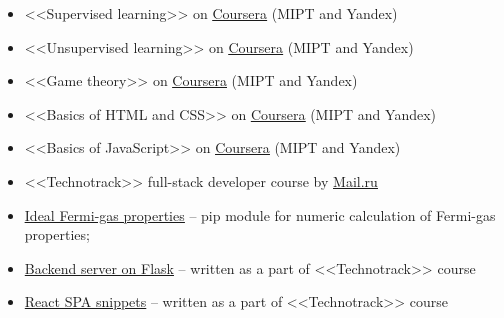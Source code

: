 
\begin{itemize}
	\item <<Supervised learning>> on \href{https://www.coursera.org/learn/supervised-learning?specialization=machine-learning-data-analysis}{\underline{Coursera}} (MIPT and Yandex)
	\item <<Unsupervised learning>> on \href{https://www.coursera.org/learn/unsupervised-learning?specialization=machine-learning-data-analysis}{\underline{Coursera}} (MIPT and Yandex)
	\item <<Game theory>> on \href{https://www.coursera.org/learn/gametheory}{\underline{Coursera}} (MIPT and Yandex)
	\item <<Basics of HTML and CSS>> on \href{https://www.coursera.org/learn/snovy-html-i-css?specialization=razrabotka-interfeysov}{\underline{Coursera}} (MIPT and Yandex)
	\item <<Basics of JavaScript>> on \href{https://www.coursera.org/learn/javascript-osnovy-i-funktsii}{\underline{Coursera}} (MIPT and Yandex)
	\item <<Technotrack>> full-stack developer course by \href{https://track.mail.ru/}{\underline{Mail.ru}}
\end{itemize}


\begin{itemize}
    \item \href{https://github.com/alekseik1/ifg-py}{\underline{Ideal Fermi-gas properties}} -- pip module for numeric calculation of Fermi-gas properties;
    \item \href{https://github.com/alekseik1/tt-ridesharing-backend}{Backend server on Flask} -- written as a part of <<Technotrack>> course
    \item \href{https://github.com/alekseik1/2018-FS-11-Frontend-Kozharin}{React SPA snippets} -- written as a part of <<Technotrack>> course
\end{itemize}



